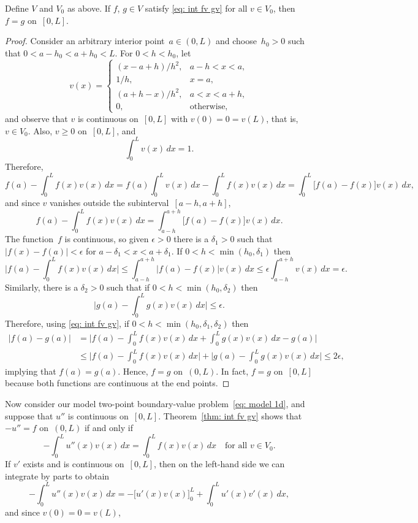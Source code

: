 \begin{theorem}\label{thm: int fv gv}
Define $V$ and $V_0$ as above. If $f$, $g\in V$ satisfy \eqref{eq: int fv gv} 
for all $v\in V_0$, then $f=g$ on~$[0,L]$.
\end{theorem}
\begin{proof}
Consider an arbitrary interior point~$a\in(0,L)$ and choose~$h_0>0$ 
such that $0<a-h_0<a+h_0<L$.  For $0<h<h_0$, let
\[
v(x)=\begin{cases}
(x-a+h)/h^2,&a-h<x<a,\\
1/h,&x=a,\\
(a+h-x)/h^2,&a<x<a+h,\\
0,&\text{otherwise,}
\end{cases}
\]
and observe that $v$ is continuous on~$[0,L]$ with $v(0)=0=v(L)$, that is,
$v\in V_0$.  Also, $v\ge0$ on~$[0,L]$, and
\[
\int_0^Lv(x)\,dx=1.
\]
Therefore,
\[
f(a)-\int_0^Lf(x)v(x)\,dx=f(a)\int_0^Lv(x)\,dx-\int_0^Lf(x)v(x)\,dx
	=\int_0^L\bigl[f(a)-f(x)]v(x)\,dx,
\]
and since $v$ vanishes outside the subinterval~$[a-h,a+h]$,
\[
f(a)-\int_0^Lf(x)v(x)\,dx=\int_{a-h}^{a+h}\bigl[f(a)-f(x)]v(x)\,dx.
\]
The function~$f$ is continuous, so given $\epsilon>0$ there is a $\delta_1>0$
such that $|f(x)-f(a)|<\epsilon$ for $a-\delta_1<x<a+\delta_1$.  
If $0<h<\min(h_0,\delta_1)$ then
\[
\biggl|f(a)-\int_0^Lf(x)v(x)\,dx\biggr|
	\le\int_{a-h}^{a+h}\bigl|f(a)-f(x)|v(x)\,dx
	\le\epsilon\int_{a-h}^{a+h}v(x)\,dx=\epsilon.
\]
Similarly, there is a $\delta_2>0$ such that if $0<h<\min(h_0,\delta_2)$ then
\[
\biggl|g(a)-\int_0^Lg(x)v(x)\,dx\biggr|\le\epsilon.
\]
Therefore, using \eqref{eq: int fv gv}, if $0<h<\min(h_0,\delta_1,\delta_2)$ 
then
\begin{align*}
|f(a)-g(a)|&=\biggl|f(a)-\int_0^Lf(x)v(x)\,dx+\int_0^Lg(x)v(x)\,dx-g(a)\biggr|\\
	&\le\biggl|f(a)-\int_0^Lf(x)v(x)\,dx\biggr|
	+\biggl|g(a)-\int_0^Lg(x)v(x)\,dx\biggr|\le2\epsilon,
\end{align*}
implying that $f(a)=g(a)$.  Hence, $f=g$ on~$(0,L)$.  In fact, $f=g$ on~$[0,L]$ 
because both functions are continuous at the end points.
\end{proof}

Now consider our model two-point boundary-value problem~\eqref{eq: model 1d},
and suppose that $u''$ is continuous on~$[0,L]$.  Theorem~\ref{thm: int fv gv}
shows that $-u''=f$ on~$(0,L)$ if and only if
\[
-\int_0^L u''(x)v(x)\,dx=\int_0^Lf(x)v(x)\,dx\quad\text{for all $v\in V_0$.}
\]
If $v'$ exists and is continuous on~$[0,L]$, then on the left-hand side we can 
integrate by parts to obtain
\[
-\int_0^L u''(x)v(x)\,dx=-\bigl[u'(x)v(x)\bigr]_0^L+\int_0^Lu'(x)v'(x)\,dx,
\]
and since $v(0)=0=v(L)$,


